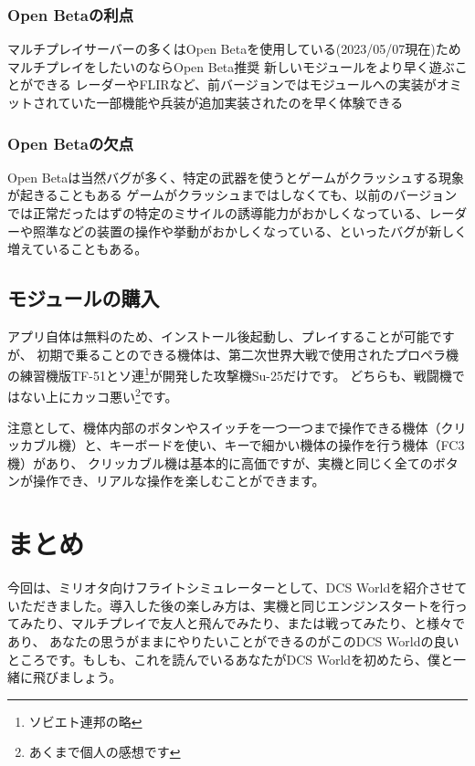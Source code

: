   \subsubsection{Open Betaの利点}
マルチプレイサーバーの多くはOpen Betaを使用している(2023/05/07現在)ためマルチプレイをしたいのならOpen Beta推奨
新しいモジュールをより早く遊ぶことができる
レーダーやFLIRなど、前バージョンではモジュールへの実装がオミットされていた一部機能や兵装が追加実装されたのを早く体験できる

  \subsubsection{Open Betaの欠点}
Open Betaは当然バグが多く、特定の武器を使うとゲームがクラッシュする現象が起きることもある
ゲームがクラッシュまではしなくても、以前のバージョンでは正常だったはずの特定のミサイルの誘導能力がおかしくなっている、レーダーや照準などの装置の操作や挙動がおかしくなっている、といったバグが新しく増えていることもある。

\subsection{モジュールの購入}
アプリ自体は無料のため、インストール後起動し、プレイすることが可能ですが、
初期で乗ることのできる機体は、第二次世界大戦で使用されたプロペラ機の練習機版TF-51とソ連\footnote{ソビエト連邦の略}が開発した攻撃機Su-25だけです。
どちらも、戦闘機ではない上にカッコ悪い\footnote{あくまで個人の感想です}です。


注意として、機体内部のボタンやスイッチを一つ一つまで操作できる機体（クリッカブル機）と、キーボードを使い、キーで細かい機体の操作を行う機体（FC3機）があり、
クリッカブル機は基本的に高価ですが、実機と同じく全てのボタンが操作でき、リアルな操作を楽しむことができます。

\section{まとめ}
今回は、ミリオタ向けフライトシミュレーターとして、DCS Worldを紹介させていただきました。導入した後の楽しみ方は、実機と同じエンジンスタートを行ってみたり、マルチプレイで友人と飛んでみたり、または戦ってみたり、と様々であり、
あなたの思うがままにやりたいことができるのがこのDCS Worldの良いところです。もしも、これを読んでいるあなたがDCS Worldを初めたら、僕と一緒に飛びましょう。